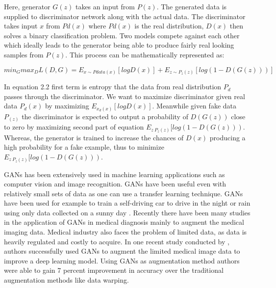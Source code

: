 %		


Here, generator $G(z)$ takes an input from $P(z)$. The generated data is supplied to discriminator network along with the actual data. The discriminator takes input $x$ from $Pd(x)$ where $Pd(x)$ is the real distribution, $D(x)$ then solves a binary classification problem. Two models compete against each other which ideally leads to the generator being able to produce fairly real looking samples from $P(z)$. This process can be mathematically represented as:

\begin{equation}
min_{G}max_{D}L(D,G) = E_{x \sim Pdata(x)}[logD(x)]+E_{z \sim P_{z}(z)}[log(1-D(G(z)))]
\end{equation} 
\citep{goodfellow2014generative}

In equation 2.2 first term is entropy that the data from real distribution $P_d$ passes through the discriminator. We want to maximize discriminator given real data $P_{d}(x)$ by maximizing $E_{x_{d}(x)}[logD(x)]$. Meanwhile given fake data $P_{(z)}$ the discriminator is expected to output a probability of $D(G(z))$ close to zero by maximizing second part of equation $E_{z~P_{z}(z)}[log(1-D(G(z)))$. Whereas, the generator is trained to increase the chances of $D(x)$ producing a high probability for a fake example, thus to minimize $E_{z~P_{z}(z)}[log(1-D(G(z)))$.

GANs has been extensively used in machine learning applications such as computer vision and image recognition. GANs have been useful even with relatively small sets of data as one can use a transfer learning technique. GANs have been used for example to train a self-driving car to drive in the night or rain using only data collected on a sunny day \citep{gurumurthy2017deligan}. Recently there have been many studies in the application of GANs in medical diagnosis mainly to augment the medical imaging data. Medical industry also faces the problem of limited data, as data is heavily regulated and costly to acquire. In one recent study conducted by \citet{frid2018synthetic}, authors successfully used GANs to augment the limited medical image data to improve a deep learning model. Using GANs as augmentation method authors were able to gain 7 percent improvement in accuracy over the traditional augmentation methods like data warping. 

